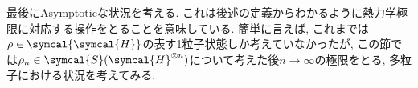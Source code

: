 

最後にAsymptoticな状況を考える. 
これは後述の定義からわかるように熱力学極限に対応する操作をとることを意味している. 
簡単に言えば, これまでは$\rho\in\symcal{\symcal{H}}$の表す1粒子状態しか考えていなかったが, この節では$\rho_n\in\symcal{S}(\symcal{H}^{\otimes n})$について考えた後$n\to\infty$の極限をとる, 多粒子における状況を考えてみる. 




